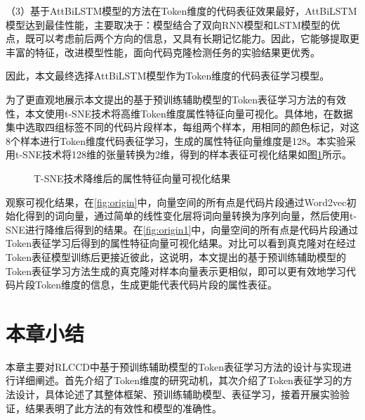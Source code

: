 （3）基于AttBiLSTM模型的方法在Token维度的代码表征效果最好，AttBiLSTM模型达到最佳性能，主要取决于：模型结合了双向RNN模型和LSTM模型的优点，既可以考虑前后两个方向的信息，又具有长期记忆能力。因此，它能够提取更丰富的特征，改进模型性能，面向代码克隆检测任务的实验结果更优秀。

因此，本文最终选择AttBiLSTM模型作为Token维度的代码表征学习模型。

为了更直观地展示本文提出的基于预训练辅助模型的Token表征学习方法的有效性，本文使用t-SNE技术将高维Token维度属性特征向量可视化。具体地，在数据集中选取四组标签不同的代码片段样本，每组两个样本，用相同的颜色标记，对这8个样本进行Token维度代码表征学习，生成的属性特征向量维度是128。本实验采用t-SNE技术将128维的张量转换为2维，得到的样本表征可视化结果如图\ref{fig:originone}所示。

\begin{figure}[htp] 
  \centering  %
  \caption{T-SNE技术降维后的属性特征向量可视化结果}    %
  \label{fig:originone}    %
\end{figure}

观察可视化结果，在\ref{fig:origin}中，向量空间的所有点是代码片段通过Word2vec初始化得到的词向量，通过简单的线性变化层将词向量转换为序列向量，然后使用t-SNE进行降维后得到的结果。在\ref{fig:origin1}中，向量空间的所有点是代码片段通过Token表征学习后得到的属性特征向量可视化结果。对比可以看到真克隆对在经过Token表征模型训练后更接近彼此，这说明，本文提出的基于预训练辅助模型的Token表征学习方法生成的真克隆对样本向量表示更相似，即可以更有效地学习代码片段Token维度的信息，生成更能代表代码片段的属性表征。

\section{本章小结}
\label{sec:Summary3}
本章主要对RLCCD中基于预训练辅助模型的Token表征学习方法的设计与实现进行详细阐述。首先介绍了Token维度的研究动机，其次介绍了Token表征学习的方法设计，具体论述了其整体框架、预训练辅助模型、表征学习，接着开展实验验证，结果表明了此方法的有效性和模型的准确性。
